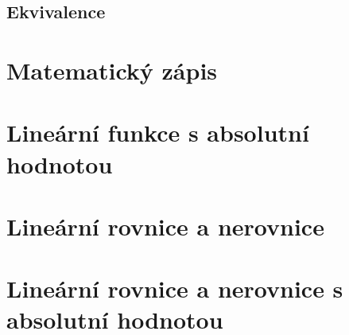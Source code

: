         \subsection{Ekvivalence}

    \section{Matematický zápis}
    \section{Lineární funkce s absolutní hodnotou}
    \section{Lineární rovnice a nerovnice}
    \section{Lineární rovnice a nerovnice s absolutní hodnotou}


